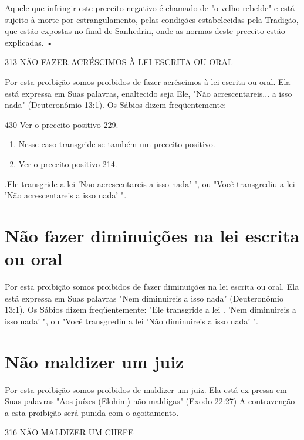 Aquele que infringir este preceito negativo é chamado de "o velho
rebelde" e está sujeito à morte por estrangulamento, pelas condições
estabele­cidas pela Tradição, que estão expostas no final de Sanhedrin,
onde as normas deste preceito estão explicadas. •

313 NÃO FAZER ACRÉSCIMOS À LEI ESCRITA OU ORAL

Por esta proibição somos proibidos de fazer acréscimos à lei escrita ou
oral. Ela está expressa em Suas palavras, enaltecido seja Ele, "Não
acrescen­tareis... a isso nada" (Deuteronômio 13:1). Os Sábios dizem
freqüentemente:

430 Ver o preceito positivo 229.


\begin{enumerate}
\def\labelenumi{\arabic{enumi}.}
\setcounter{enumi}{430}
\item
 
 Nesse caso transgride se também um preceito positivo.
 
\item
 
 Ver o preceito positivo 214.
 
\end{enumerate}


.Ele transgride a lei 'Nao acrescentareis a isso nada'
", ou "Você transgrediu a lei 'Não acrescentareis a isso nada' ".

\section{Não fazer diminuições na lei escrita ou oral}

Por esta proibição somos proibidos de fazer diminuições na lei es­crita
ou oral. Ela está expressa em Suas palavras "Nem diminuireis a isso
nada" (Deuteronômio 13:1). Os Sábios dizem freqüentemente: "Ele
transgride a lei . 'Nem diminuireis a isso nada' ", ou "Você transgrediu
a lei 'Não diminuireis a isso nada' ".

\section{Não maldizer um juiz}

Por esta proibição somos proibidos de maldizer um juiz. Ela está ex
pressa em Suas palavras "Aos juízes (Elohim) não maldigas" (Exodo 22:27)
A contravenção a esta proibição será punida com o açoitamento.

316 NÃO MALDIZER UM CHEFE

